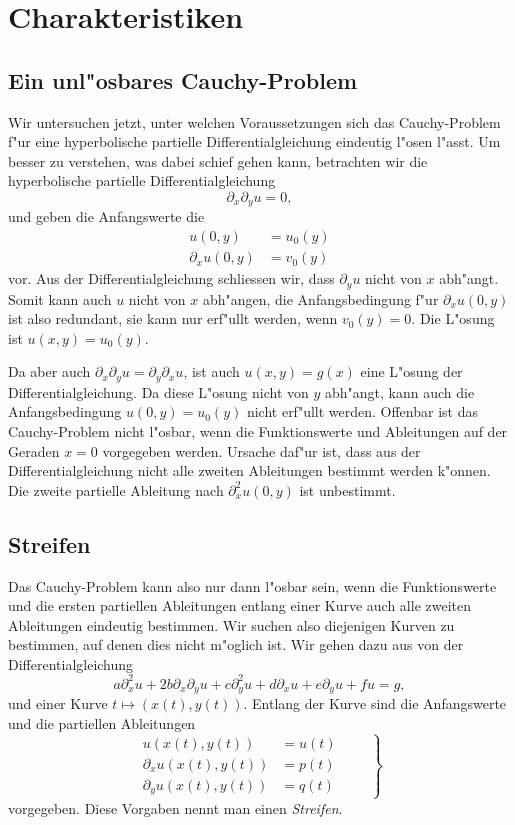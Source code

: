\section{Charakteristiken}
\subsection{Ein unl"osbares Cauchy-Problem}
Wir untersuchen jetzt, unter welchen Voraussetzungen sich das Cauchy-Problem
f"ur eine hyperbolische partielle Differentialgleichung eindeutig l"osen l"asst.
Um besser zu verstehen, was dabei schief gehen kann, betrachten wir die
hyperbolische partielle Differentialgleichung
\[
\partial_x\partial_y u=0,
\]
und geben die Anfangswerte die
\begin{align*}
u(0,y)&=u_0(y)
\\
\partial_xu(0,y)&=v_0(y)
\end{align*}
vor.
Aus der Differentialgleichung schliessen wir, dass $\partial_y u$
nicht von $x$ abh"angt. Somit kann auch $u$ nicht von $x$ abh"angen,
die Anfangsbedingung f"ur $\partial_xu(0,y)$ ist also redundant,
sie kann nur erf"ullt werden, wenn $v_0(y)=0$.
Die L"osung ist $u(x,y)=u_0(y)$.

Da aber auch $\partial_x\partial_yu=\partial_y\partial_xu$, ist auch
$u(x,y)=g(x)$ eine L"osung der Differentialgleichung. Da diese
L"osung nicht von $y$ abh"angt, kann auch die Anfangsbedingung $u(0,y)=u_0(y)$
nicht erf"ullt werden. Offenbar ist das Cauchy-Problem nicht l"osbar, wenn die
Funktionswerte und Ableitungen auf der Geraden $x=0$ vorgegeben werden.
Ursache daf"ur ist, dass aus der Differentialgleichung nicht alle zweiten
Ableitungen bestimmt werden k"onnen. Die zweite partielle Ableitung
nach $\partial_x^2u(0,y)$ ist unbestimmt.

\subsection{Streifen}
Das Cauchy-Problem kann also nur dann l"osbar sein, wenn die Funktionswerte
und die ersten partiellen Ableitungen entlang einer Kurve
auch alle zweiten Ableitungen eindeutig bestimmen. Wir suchen also
diejenigen Kurven zu bestimmen, auf denen dies nicht m"oglich ist.
Wir gehen dazu aus von der Differentialgleichung
\begin{equation}
a\partial_x^2u+2b\partial_x\partial_yu+c\partial_y^2u+d\partial_xu+e\partial_yu+fu=g,
\label{charequation}
\end{equation}
und einer Kurve
$t\mapsto(x(t),y(t))$. Entlang der Kurve sind die Anfangswerte
und die partiellen Ableitungen
\begin{equation}
\left.
\begin{aligned}
u(x(t),y(t))&=u(t)\\
\partial_xu(x(t),y(t))&=p(t)\\
\partial_yu(x(t),y(t))&=q(t)
\end{aligned}
\qquad
\right\}
\label{charanfangs}
\end{equation}
vorgegeben. Diese Vorgaben nennt man einen {\em Streifen}.

